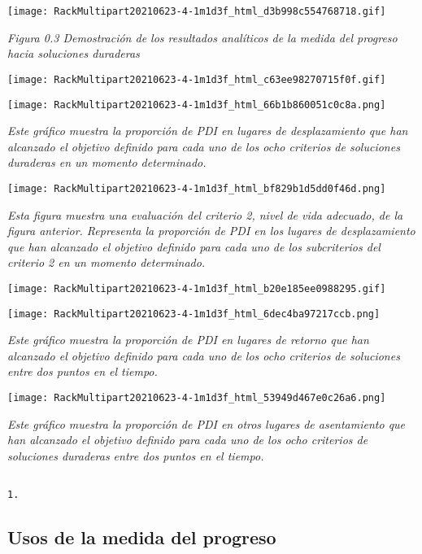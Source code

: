 \documentclass[
]{book}
\begin{document}
\texttt{[image: RackMultipart20210623-4-1m1d3f\_html\_d3b998c554768718.gif]}

\emph{Figura 0.3 Demostración de los resultados analíticos de la medida del progreso hacia soluciones duraderas}

\texttt{[image: RackMultipart20210623-4-1m1d3f\_html\_c63ee98270715f0f.gif]}

\texttt{[image: RackMultipart20210623-4-1m1d3f\_html\_66b1b860051c0c8a.png]}

\emph{Este gráfico muestra la proporción de PDI en lugares de desplazamiento que han alcanzado el objetivo definido para cada uno de los ocho criterios de soluciones duraderas en un momento determinado.}

\texttt{[image: RackMultipart20210623-4-1m1d3f\_html\_bf829b1d5dd0f46d.png]}

\emph{Esta figura muestra una evaluación del criterio 2, nivel de vida adecuado, de la figura anterior. Representa la proporción de PDI en los lugares de desplazamiento que han alcanzado el objetivo definido para cada uno de los subcriterios del criterio 2 en un momento determinado.}

\texttt{[image: RackMultipart20210623-4-1m1d3f\_html\_b20e185ee0988295.gif]}

\texttt{[image: RackMultipart20210623-4-1m1d3f\_html\_6dec4ba97217ccb.png]}

\emph{Este gráfico muestra la proporción de PDI en lugares de retorno que han alcanzado el objetivo definido para cada uno de los ocho criterios de soluciones entre dos puntos en el tiempo.}

\texttt{[image: RackMultipart20210623-4-1m1d3f\_html\_53949d467e0c26a6.png]}

\emph{Este gráfico muestra la proporción de PDI en otros lugares de asentamiento que han alcanzado el objetivo definido para cada uno de los ocho criterios de soluciones duraderas entre dos puntos en el tiempo.}

\hypertarget{section-4}{%
\subsection{}\label{section-4}}

\begin{verbatim}
1.
\end{verbatim}

\hypertarget{usos-de-la-medida-del-progreso}{%
\subsection{Usos de la medida del progreso}\label{usos-de-la-medida-del-progreso}}
\end{document}
